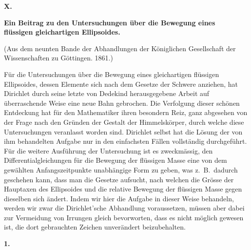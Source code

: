 \documentclass[12pt,a4paper]{book}
\theoremstyle{definition}
\theoremstyle{remark}
\begin{document}
\newpage
\begin{center}
\Large\textbf{X.}
\end{center}
\vspace{-0.5em}
\begin{center}
\Large\textbf{Ein Beitrag zu den Untersuchungen \"uber die Bewegung eines}\\[0.3em]
\Large\textbf{fl\"ussigen gleichartigen Ellipsoides.}
\end{center}
\vspace{0.3em}
\begin{center}
\small (Aus dem neunten Bande der Abhandlungen der K\"oniglichen Gesellschaft der\\
\small Wissenschaften zu G\"ottingen. 1861.)
\end{center}

\bigskip

F\"ur die Untersuchungen \"uber die Bewegung eines gleichartigen fl\"ussigen Ellipsoides, dessen Elemente sich nach dem Gesetze der Schwere anziehen, hat Dirichlet durch seine letzte von Dedekind herausgegebene Arbeit auf \"uberraschende Weise eine neue Bahn gebrochen. Die Verfolgung dieser sch\"onen Entdeckung hat f\"ur den Mathematiker ihren besondern Reiz, ganz abgesehen von der Frage nach den Gr\"unden der Gestalt der Himmelsk\"orper, durch welche diese Untersuchungen veranlasst worden sind. Dirichlet selbst hat die L\"osung der von ihm behandelten Aufgabe nur in den einfachsten F\"allen vollst\"andig durchgef\"uhrt. F\"ur die weitere Ausf\"uhrung der Untersuchung ist es zweckm\"assig, den Differentialgleichungen f\"ur die Bewegung der fl\"ussigen Masse eine von dem gew\"ahlten Anfangszeitpunkte unabh\"angige Form zu geben, was z.~B.~dadurch geschehen kann, dass man die Gesetze aufsucht, nach welchen die Gr\"osse der Hauptaxen des Ellipsoides und die relative Bewegung der fl\"ussigen Masse gegen dieselben sich \"andert. Indem wir hier die Aufgabe in dieser Weise behandeln, werden wir zwar die Dirichlet'sche Abhandlung voraussetzen, m\"ussen aber dabei zur Vermeidung von Irrungen gleich bevorworten, dass es nicht m\"oglich gewesen ist, die dort gebrauchten Zeichen unver\"andert beizubehalten.

\begin{center}
\textbf{1.}
\end{center}
\end{document}
